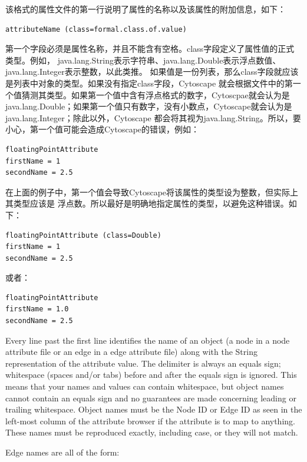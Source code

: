该格式的属性文件的第一行说明了属性的名称以及该属性的附加信息，如下：

\begin{verbatim}
attributeName (class=formal.class.of.value)
\end{verbatim}

第一个字段必须是属性名称，并且不能含有空格。class字段定义了属性值的正式类型。例如，
java.lang.String表示字符串、java.lang.Double表示浮点数值、java.lang.Integer表示整数，以此类推。
如果值是一份列表，那么class字段就应该是列表中对象的类型。如果没有指定class字段，Cytoscape
就会根据文件中的第一个值猜测其类型。如果第一个值中含有浮点格式的数字，Cytoscpae就会认为是
java.lang.Double；如果第一个值只有数字，没有小数点，Cytoscape就会认为是java.lang.Integer；除此以外，Cytoscape
都会将其视为java.lang.String。所以，要小心，第一个值可能会造成Cytoscape的错误，例如：

 \begin{verbatim}
floatingPointAttribute
firstName = 1
secondName = 2.5
\end{verbatim}

在上面的例子中，第一个值会导致Cytoscape将该属性的类型设为整数，但实际上其类型应该是
浮点数。所以最好是明确地指定属性的类型，以避免这种错误。如下：

 \begin{verbatim}
floatingPointAttribute (class=Double)
firstName = 1
secondName = 2.5
\end{verbatim}

或者：

 \begin{verbatim}
floatingPointAttribute 
firstName = 1.0
secondName = 2.5
\end{verbatim}

Every line past the first line identifies the name of an object (a node in a
node attribute file or an edge in a edge attribute file) along with the String
representation of the attribute value. The delimiter is always an equals sign;
whitespace (spaces and/or tabs) before and after the equals sign is ignored.
This means that your names and values can contain whitespace, but object names
cannot contain an equals sign and no guarantees are made concerning leading or
trailing whitespace. Object names must be the Node ID or Edge ID as seen in the
left-most column of the attribute browser if the attribute is to map to
anything. These names must be reproduced exactly, including case, or they will
not match. 

Edge names are all of the form: 


